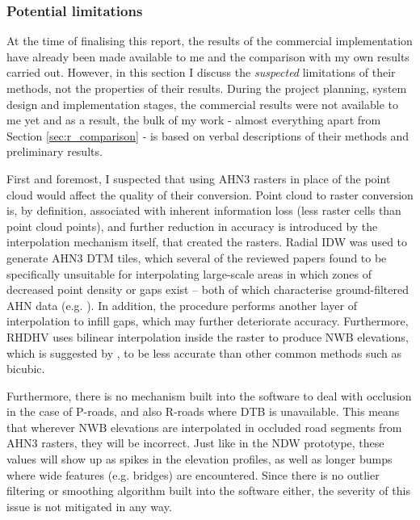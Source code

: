 \subsubsection{Potential limitations}

At the time of finalising this report, the results of the commercial implementation have already been made available to me and the comparison with my own results carried out. However, in this section I discuss the \textit{suspected} limitations of their methods, not the properties of their results. During the project planning, system design and implementation stages, the commercial results were not available to me yet and as a result, the bulk of my work - almost everything apart from Section \ref{sec:r_comparison} - is based on verbal descriptions of their methods and preliminary results.

First and foremost, I suspected that using AHN3 rasters in place of the point cloud would affect the quality of their conversion. Point cloud to raster conversion is, by definition, associated with inherent information loss (less raster cells than point cloud points), and further reduction in accuracy is introduced by the interpolation mechanism itself, that created the rasters. Radial IDW was used to generate AHN3 DTM tiles, which several of the reviewed papers found to be specifically unsuitable for interpolating large-scale areas in which zones of decreased point density or gaps exist – both of which characterise ground-filtered AHN data (e.g. \cite{guo_etal_2010}). In addition, the procedure performs another layer of interpolation to infill gaps, which may further deteriorate accuracy. Furthermore, RHDHV uses bilinear interpolation inside the raster to produce NWB elevations, which is suggested by \cite{shi_etal_2005}, to be less accurate than other common methods such as bicubic.

Furthermore, there is no mechanism built into the software to deal with occlusion in the case of P-roads, and also R-roads where DTB is unavailable. This means that wherever NWB elevations are interpolated in occluded road segments from AHN3 rasters, they will be incorrect. Just like in the NDW prototype, these values will show up as spikes in the elevation profiles, as well as longer bumps where wide features (e.g. bridges) are encountered. Since there is no outlier filtering or smoothing algorithm built into the software either, the severity of this issue is not mitigated in any way.

